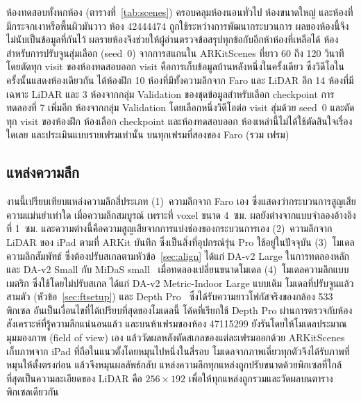 ห้องทดสอบทั้งหกห้อง (ตารางที่~\ref{tab:scenes}) ครอบคลุมห้องนอนทั่วไป ห้องขนาดใหญ่
และห้องที่มีกระจกเงาหรือพื้นผิวมันวาว ห้อง 42444474 ถูกใช้ระหว่างการพัฒนากระบวนการ
ผลของห้องนี้จึงไม่นับเป็นข้อมูลที่กันไว้ ผลรายห้องจึงช่วยให้ผู้อ่านตรวจข้อสรุปทุกข้อกับอีกห้าห้องที่เหลือได้
ห้องสำหรับการปรับจูนสุ่มเลือก (seed~0) จากการสแกนใน ARKitScenes ที่ยาว 60 ถึง 120 วินาที
โดยตัดทุก visit ของห้องทดสอบออก visit คือการเก็บข้อมูลบ้านหลังหนึ่งในครั้งเดียว ซึ่งวิดีโอในครั้งนั้นแสดงห้องเดียวกัน
ได้ห้องฝึก 10 ห้องที่มีทั้งความลึกจาก Faro และ LiDAR อีก 14 ห้องที่มีเฉพาะ LiDAR
และ 3 ห้องจากกลุ่ม Validation ของชุดข้อมูลสำหรับเลือก checkpoint
การทดลองที่ 7 เพิ่มอีก \rsVN{} ห้องจากกลุ่ม Validation โดยเลือกหนึ่งวิดีโอต่อ visit สุ่มด้วย seed~0
และตัดทุก visit ของห้องฝึก ห้องเลือก checkpoint และห้องทดสอบออก ห้องเหล่านี้ไม่ได้ใช้ตัดสินใจเรื่องใดเลย
และประเมินแบบรายเฟรมเท่านั้น บนทุกเฟรมที่สองของ Faro (รวม \rsVFRAMES{} เฟรม)

\subsection{แหล่งความลึก}\label{sec:sources}
งานนี้เปรียบเทียบแหล่งความลึกสี่ประเภท (1)~ความลึกจาก Faro เอง ซึ่งแสดงว่ากระบวนการสูญเสียความแม่นยำเท่าใด
เมื่อความลึกสมบูรณ์ เพราะที่ voxel ขนาด 4~ซม. ผลยังต่างจากแบบจำลองอ้างอิงที่ 1~ซม.
และความต่างนี้คือความสูญเสียจากการแบ่งช่องของกระบวนการเอง (2)~ความลึกจาก LiDAR ของ iPad ตามที่ ARKit บันทึก
ซึ่งเป็นสิ่งที่อุปกรณ์รุ่น Pro ใช้อยู่ในปัจจุบัน (3)~โมเดลความลึกสัมพัทธ์ ซึ่งต้องปรับสเกลตามหัวข้อ~\ref{sec:align}
ได้แก่ \mbox{DA-v2} Large ในการทดลองหลัก และ \mbox{DA-v2} Small กับ MiDaS small~\cite{midas}
เมื่อทดลองเปลี่ยนขนาดโมเดล (4)~โมเดลความลึกแบบเมตริก ซึ่งใช้โดยไม่ปรับสเกล ได้แก่ \mbox{DA-v2} Metric-Indoor Large
แบบเดิม โมเดลที่ปรับจูนแล้วสามตัว (หัวข้อ~\ref{sec:ftsetup}) และ Depth Pro~\cite{depthpro}
ซึ่งได้รับความยาวโฟกัสจริงของกล้อง 533 พิกเซล อันเป็นเงื่อนไขที่ได้เปรียบที่สุดของโมเดลนี้
โค้ดที่เรียกใช้ Depth Pro ผ่านการตรวจกับห้องสังเคราะห์ที่รู้ความลึกแน่นอนแล้ว และบนห้าเฟรมของห้อง 47115299
ยังรันโดยให้โมเดลประมาณมุมมองภาพ (field of view) เอง แล้ววัดผลหลังตัดสเกลของแต่ละเฟรมออกด้วย
ARKitScenes เก็บภาพจาก iPad ที่ถือในแนวตั้งโดยหมุนไปหนึ่งในสี่รอบ โมเดลจากภาพเดี่ยวทุกตัวจึงได้รับภาพที่หมุนให้ตั้งตรงก่อน
แล้วจึงหมุนผลลัพธ์กลับ แหล่งความลึกทุกแหล่งถูกปรับขนาดด้วยพิกเซลที่ใกล้ที่สุดเป็นความละเอียดของ LiDAR คือ
$256\times192$ เพื่อให้ทุกแหล่งถูกรวมและวัดผลบนตารางพิกเซลเดียวกัน

